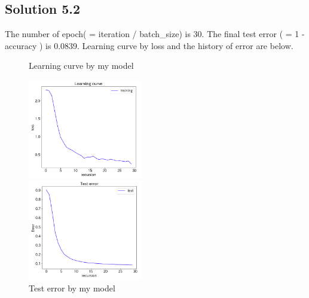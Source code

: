 \documentclass[a4paper]{article}
\theoremstyle{definition}
\newenvironment{soln}{
	\leavevmode\color{blue}\ignorespaces
}{}
\begin{document}
	\subsection*{Solution 5.2}	
	\begin{soln}
	The number of epoch( = iteration / batch\_size) is 30. The final test error ( = 1 - accuracy ) is 0.0839. Learning curve by loss and the history of error are below.
\begin{figure}[htbp]
\begin{minipage}{0.5\hsize}
\begin{center}
\caption{Learning curve by my model}
\includegraphics[width=50mm]{./img/my_learningcurve.png}
\end{center}
\captionsetup{labelformat=empty}
\end{minipage}
\begin{minipage}{0.5\hsize}
\begin{center}
\caption{Test error by my model}
\includegraphics[width=50mm]{./img/my_testerror.png}
\end{center}
\captionsetup{labelformat=empty}
\end{minipage}
\end{figure}
	\end{soln}
\end{document}
